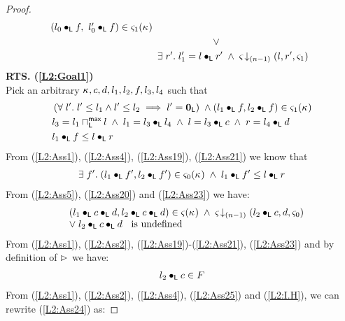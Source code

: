 \begin{lemma}[]
\begin{proof}
\begin{align}
\begin{array}{l}
  	(l_0 \composeL f,\ l'_0 \composeL f) \in \amod{1}(\ca{}) 
  \end{array} \nonumber\\
%
	&\hspace*{2cm}\lor  \nonumber\\
	&\exsts{r'} l'_1 = l \composeL r' \;\land\; \extendsAMUpto{\amod}{(n-1)}{l}{r'}{\amod{1}}\label{L2:Goal2}
% 
\end{align}
%
%
%
%
%
%
\textbf{RTS. (\ref{L2:Goal1})}\\
Pick an arbitrary $\kappa_{}, c, d, l_1, l_2, f, l_3, l_4$ such that 
\begin{align}
	&\left(\forall\; l'.\; l' \leq l_1 \land l' \leq l_2 \implies l' = \mathbf{0}_{\textsf{L}}\right)\;\land
	(l_1 \bullet_{\textsf{L}} f, l_2 \bullet_{\textsf{L}} f) \in \varsigma_{1}(\kappa_{}) \label{L2:Ass19}\\
	&l_3 = l_1 \sqcap_{\textsf{L}}^{\textsf{max}} l \;\land\; l_1 = l_3 \bullet_{\textsf{L}} l_4 \;\land\; l = l_3 \bullet_{\textsf{L}} c \;\land\; r = l_4 \bullet_{\textsf{L}} d\label{L2:Ass20}\\
	&l_1 \bullet_{\textsf{L}} f \leq l \bullet_{\textsf{L}} r \label{L2:Ass21}
\end{align}
From (\ref{L2:Ass1}), (\ref{L2:Ass4}), (\ref{L2:Ass19}), (\ref{L2:Ass21}) we know that 
%
\begin{align}
	\exists\; f'.\; (l_1 \bullet_{\textsf{L}} f', l_2 \bullet_{\textsf{L}} f') \in \varsigma_{0}(\kappa_{}) \;\land\; l_1 \bullet_{\textsf{L}} f' \leq l \bullet_{\textsf{L}} r \label{L2:Ass23}
\end{align}
%
From (\ref{L2:Ass5}), (\ref{L2:Ass20}) and (\ref{L2:Ass23}) we have:
%
\begin{align}
	\begin{array}{l l}
		&(l_1 \bullet_{\textsf{L}} c \bullet_{\textsf{L}} d, l_2 \bullet_{\textsf{L}} c \bullet_{\textsf{L}} d) \in \varsigma_{}(\kappa_{})\;\land\;  \varsigma_{} \!\downarrow_{(n-1)} \left(l_2 \bullet_{\textsf{L}} c, d, \varsigma_{0}\right) \\
		& \lor\; l_2 \bullet_{\textsf{L}} c \bullet_{\textsf{L}} d \hspace*{0.2cm}\text{ is undefined}
	\end{array} \label{L2:Ass24}
\end{align}
From (\ref{L2:Ass1}), (\ref{L2:Ass2}), (\ref{L2:Ass19})-(\ref{L2:Ass21}), (\ref{L2:Ass23}) and by definition of $\rhd$ we have:
\begin{align}
	l_2 \bullet_{\textsf{L}} c \in F \label{L2:Ass25}
\end{align}
From (\ref{L2:Ass1}), (\ref{L2:Ass2}), (\ref{L2:Ass4}), (\ref{L2:Ass25}) and (\ref{L2:I.H}), we can rewrite (\ref{L2:Ass24}) as:

\end{proof}
\end{lemma}
